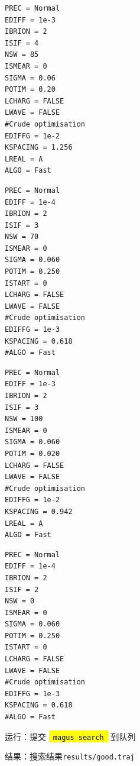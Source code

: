 \documentclass[12pt]{article}
\newcommand{\code}[1]{
  \begingroup
  \sethlcolor{Seashell}
  {\hl{\texttt{~#1~}}}
  \endgroup
}
\newcommand{\file}[1]{\texttt{#1}}
\begin{document}
\begin{paracol}{2}
    \begin{tcolorbox}[enhanced, breakable, title=\file{q/INCAR}]
        \begin{verbatim} 
PREC = Normal
EDIFF = 1e-3
IBRION = 2 
ISIF = 4 
NSW = 85
ISMEAR = 0
SIGMA = 0.06
POTIM = 0.20
LCHARG = FALSE
LWAVE = FALSE
#Crude optimisation
EDIFFG = 1e-2
KSPACING = 1.256
LREAL = A 
ALGO = Fast
        \end{verbatim}
    \end{tcolorbox}                   
    \begin{tcolorbox}[enhanced, breakable, title=\file{e/INCAR}]
        \begin{verbatim} 
PREC = Normal
EDIFF = 1e-4
IBRION = 2 
ISIF = 3 
NSW = 70
ISMEAR = 0
SIGMA = 0.060
POTIM = 0.250
ISTART = 0 
LCHARG = FALSE
LWAVE = FALSE
#Crude optimisation
EDIFFG = 1e-3
KSPACING = 0.618
#ALGO = Fast
        \end{verbatim}
    \end{tcolorbox}  
    \switchcolumn[1]
    \begin{tcolorbox}[enhanced, breakable, title=\file{w/INCAR}]
        \begin{verbatim} 
PREC = Normal
EDIFF = 1e-3
IBRION = 2 
ISIF = 3 
NSW = 100 
ISMEAR = 0
SIGMA = 0.060
POTIM = 0.020
LCHARG = FALSE
LWAVE = FALSE
#Crude optimisation
EDIFFG = 1e-2
KSPACING = 0.942
LREAL = A 
ALGO = Fast
        \end{verbatim}
    \end{tcolorbox}           
    \begin{tcolorbox}[enhanced, breakable, title=\file{r/INCAR}]
        \begin{verbatim} 
PREC = Normal
EDIFF = 1e-4
IBRION = 2 
ISIF = 2 
NSW = 0 
ISMEAR = 0 
SIGMA = 0.060
POTIM = 0.250
ISTART = 0 
LCHARG = FALSE
LWAVE = FALSE
#Crude optimisation
EDIFFG = 1e-3
KSPACING = 0.618
#ALGO = Fast
        \end{verbatim}
    \end{tcolorbox}
\end{paracol}
运行：提交\code{magus search}到队列\par
结果：搜索结果\file{results/good.traj}
\end{document}
